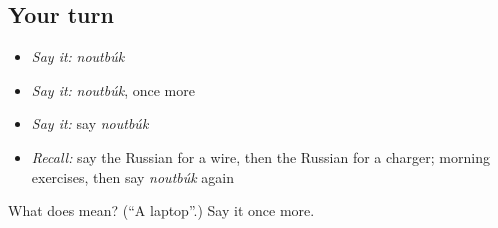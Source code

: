 \subsection*{Your turn}
\begin{itemize}
\raggedright
  \item \emph{Say it:} \emph{noutbúk}
  \item \emph{Say it:} \emph{noutbúk}, once more
  \item \emph{Say it:} say \emph{noutbúk}
  \item \emph{Recall:} say the Russian for a wire, then the Russian for a charger; morning exercises, then say \emph{noutbúk} again
\end{itemize}

\begin{tcolorbox}[breakable,colback=teal!4,colframe=teal!35!black,title={Before you move on}]
What does  mean? (\textquotedblleft{}A laptop\textquotedblright{}.) Say it once more.
\end{tcolorbox}
